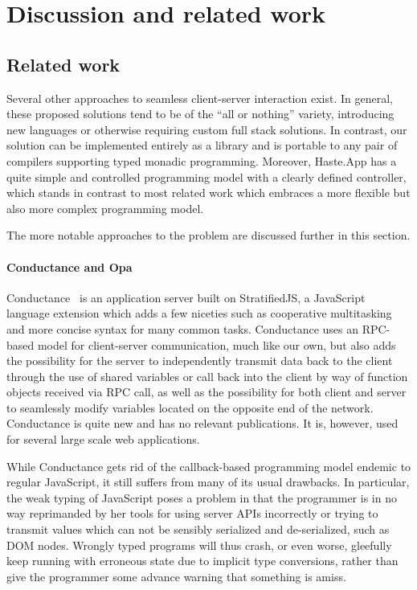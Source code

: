 \documentclass[preprint]{sigplanconf}
\begin{document}
\section{Discussion and related work}

\subsection{Related work}
\label{sec:related}

Several other approaches to seamless client-server interaction exist. In
general, these proposed solutions tend to be of the ``all or nothing'' variety,
introducing new languages or otherwise requiring custom full stack solutions.
In contrast, our solution can be implemented entirely as a library and is
portable to any pair of compilers supporting typed monadic programming.
Moreover, Haste.App has a quite simple and controlled programming model with a
clearly defined controller, which stands in contrast to most related work which
embraces a more flexible but also more complex programming model.

The more notable approaches to the problem are discussed further in this section.

\paragraph{Conductance and Opa} Conductance\ \cite{conductance} is an application
server built on StratifiedJS, a JavaScript language extension which adds a few
niceties such as cooperative multitasking and more concise syntax for many
common tasks.
Conductance uses an RPC-based model for client-server communication, much like
our own, but also adds the possibility for the server to independently transmit
data back to the client through the use of shared variables or call back into
the client by way of function objects received via RPC call, as well as the
possibility for both client and server to seamlessly modify variables located
on the opposite end of the network. Conductance is quite new and has no
relevant publications. It is, however, used for several large scale web
applications.

While Conductance gets rid of the callback-based programming model endemic to
regular JavaScript, it still suffers from many of its usual drawbacks. In
particular, the weak typing of JavaScript poses a problem in that the
programmer is in no way reprimanded by her tools for using server APIs
incorrectly or trying to transmit values which can not be sensibly serialized
and de-serialized, such as DOM nodes. Wrongly typed programs will thus crash, or
even worse, gleefully keep running with erroneous state due to implicit type
conversions, rather than give the programmer some advance warning that something
is amiss.
\end{document}
